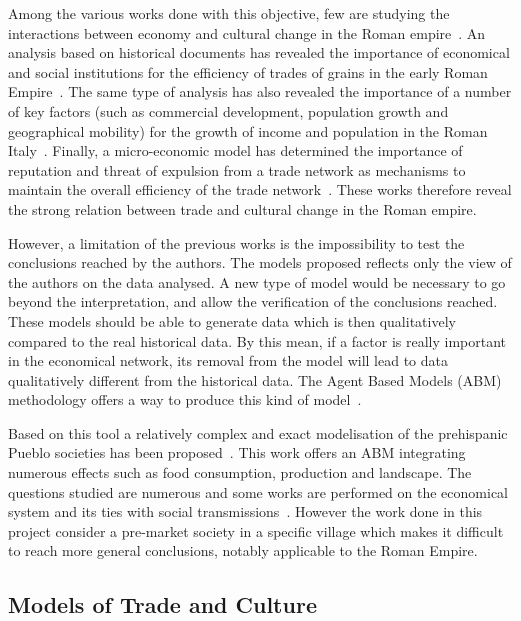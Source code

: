 \documentclass{wscpaperproc}
\begin{document}
Among the various works done with this objective, few are studying the interactions between economy and cultural change in the Roman empire~\cite{terpstra_trade_2011,kessler_organization_2007,scheidel_model_2007}. 
An analysis based on historical documents has revealed the importance of economical and social institutions for the efficiency of trades of grains in the early Roman Empire~\cite{kessler_organization_2007}. The same type of analysis has also revealed the importance of a number of key factors (such as commercial development, population growth and geographical mobility) for the growth of income and population in the Roman Italy~\cite{scheidel_model_2007}. Finally, a micro-economic model has determined the importance of reputation and threat of expulsion from a trade network as mechanisms to maintain the overall efficiency of the trade network~\cite{terpstra_trade_2011}. These works therefore reveal the strong relation between trade and cultural change in the Roman empire.


However, a limitation of the previous works is the impossibility to test the conclusions reached by the authors. The models proposed reflects only the view of the authors on the data analysed. A new type of model would be necessary to go beyond the interpretation, and allow the verification of the conclusions reached. These models should be able to generate data which is then qualitatively compared to the real historical data. By this mean, if a factor is really important in the economical network, its removal from the model will lead to data qualitatively different from the historical data. The Agent Based Models (ABM) methodology offers a way to produce this kind of model~\cite{lake_trends_2014}.

Based on this tool a relatively complex and exact modelisation of the prehispanic Pueblo societies has been proposed~\cite{kohler_modelling_2012}. This work offers an ABM integrating numerous effects such as food consumption, production and landscape. The questions studied are  numerous and some works are performed on the economical system and its ties with social transmissions~\cite{kobti_emergence_2006,cockburn_simulating_2013}. However the work done in this project consider a pre-market society in a specific village which makes it difficult to reach more general conclusions, notably applicable to the Roman Empire.


\subsection{Models of Trade and Culture}
\end{document}
